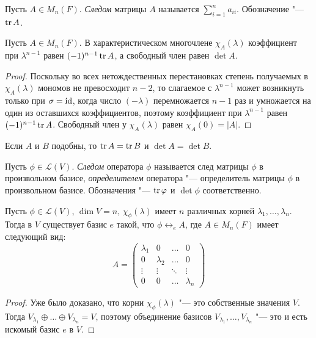 \begin{definition}
	Пусть $A \in M_n(F)$. \textit{Следом} матрицы $A$ называется $\sum_{i = 1}^na_{ii}$. Обозначение "--- $\operatorname{tr}{A}$.
\end{definition}

\begin{proposition}
	Пусть $A \in M_n(F)$. В характеристическом многочлене $\chi_A(\lambda)$ коэффициент при $\lambda^{n - 1}$ равен $(-1)^{n - 1}\operatorname{tr}{A}$, а свободный член равен $\det{A}$.
\end{proposition}

\begin{proof}
	Поскольку во всех нетождественных перестановках степень получаемых в $\chi_A(\lambda)$ мономов не превосходит $n - 2$, то слагаемое с $\lambda^{n - 1}$ может возникнуть только при $\sigma = \operatorname{id}$, когда число $(-\lambda)$ перемножается $n - 1$ раз и умножается на один из оставшихся коэффициентов, поэтому коэффициент при $\lambda^{n - 1}$ равен $(-1)^{n - 1}\operatorname{tr}{A}$. Свободный член у $\chi_A(\lambda)$ равен $\chi_A(0) = |A|$.
\end{proof}

\begin{corollary}
	Если $A$ и $B$ подобны, то $\operatorname{tr}{A} = \operatorname{tr}{B}$ и $\det{A} = \det{B}$.
\end{corollary}

\begin{definition}
	Пусть $\phi \in \mathcal{L}(V)$. \textit{Следом} оператора $\phi$ называется след матрицы $\phi$ в произвольном базисе, \textit{определителем} оператора "--- определитель матрицы $\phi$ в произвольном базисе. Обозначения "--- $\operatorname{tr}{\varphi}$ и $\det{\phi}$ соответственно.
\end{definition}

\begin{theorem}
	Пусть $\phi \in \mathcal{L}(V)$, $\dim{V} = n$, $\chi_\phi(\lambda)$ имеет $n$ различных корней $\lambda_1, \dots, \lambda_n$. Тогда в $V$ существует базис $e$ такой, что $\phi \leftrightarrow_e A$, где $A \in M_n(F)$ имеет следующий вид:
	\[A = \begin{pmatrix}
		\lambda_1 & 0 & \dots & 0\\
		0 & \lambda_2 & \dots & 0\\
		\vdots & \vdots & \ddots & \vdots\\
		0 & 0 & \dots & \lambda_n
	\end{pmatrix}\]
\end{theorem}

\begin{proof}
	Уже было доказано, что корни $\chi_\phi(\lambda)$ "--- это собственные значения $V$. Тогда $V_{\lambda_1} \oplus \dots \oplus V_{\lambda_n} = V$, поэтому объединение базисов $V_{\lambda_1}, \dots, V_{\lambda_n}$ "--- это и есть искомый базис $e$ в $V$.
\end{proof}

